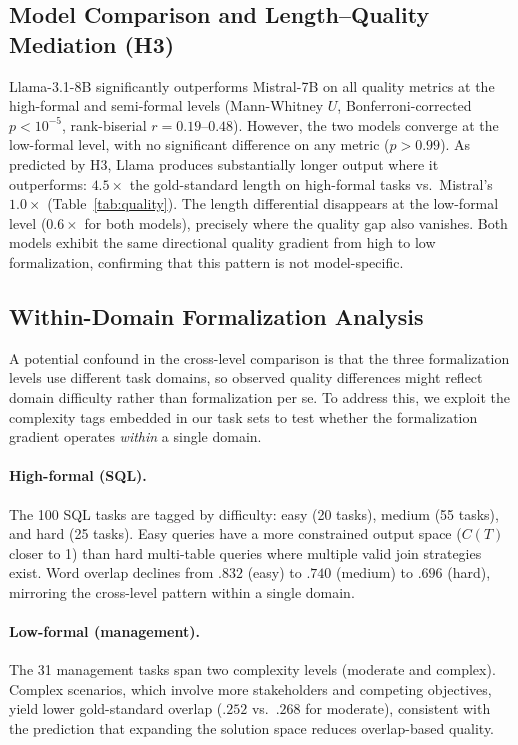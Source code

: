 \documentclass[runningheads]{llncs}
\begin{document}
\subsection{Model Comparison and Length--Quality Mediation (H3)}
\label{sec:model-comparison}

Llama-3.1-8B significantly outperforms Mistral-7B on all quality metrics at the high-formal and semi-formal levels (Mann-Whitney $U$, Bonferroni-corrected $p < 10^{-5}$, rank-biserial $r = 0.19$--$0.48$). However, the two models converge at the low-formal level, with no significant difference on any metric ($p > 0.99$). As predicted by H3, Llama produces substantially longer output where it outperforms: $4.5\times$ the gold-standard length on high-formal tasks vs.\ Mistral's $1.0\times$ (Table~\ref{tab:quality}). The length differential disappears at the low-formal level ($0.6\times$ for both models), precisely where the quality gap also vanishes. Both models exhibit the same directional quality gradient from high to low formalization, confirming that this pattern is not model-specific.

\subsection{Within-Domain Formalization Analysis}
\label{sec:within-domain}

A potential confound in the cross-level comparison is that the three formalization levels use different task domains, so observed quality differences might reflect domain difficulty rather than formalization per se. To address this, we exploit the complexity tags embedded in our task sets to test whether the formalization gradient operates \emph{within} a single domain.

\paragraph{High-formal (SQL).}
The 100 SQL tasks are tagged by difficulty: easy (20 tasks), medium (55 tasks), and hard (25 tasks). Easy queries have a more constrained output space ($C(T)$ closer to 1) than hard multi-table queries where multiple valid join strategies exist. Word overlap declines from $.832$ (easy) to $.740$ (medium) to $.696$ (hard), mirroring the cross-level pattern within a single domain.

\paragraph{Low-formal (management).}
The 31 management tasks span two complexity levels (moderate and complex). Complex scenarios, which involve more stakeholders and competing objectives, yield lower gold-standard overlap ($.252$ vs.\ $.268$ for moderate), consistent with the prediction that expanding the solution space reduces overlap-based quality.
\end{document}
